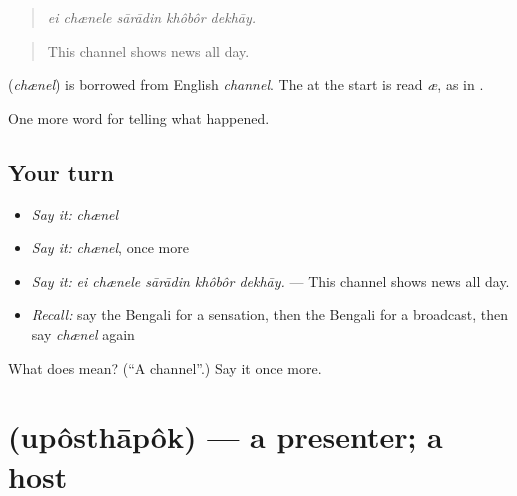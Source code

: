 \begin{quote}
    
\end{quote}

\begin{quote}
\emph{ei chænele sārādin khôbôr dekhāy.}
\end{quote}

\begin{quote}
This channel shows news all day.
\end{quote}

\begin{cousinweb}
\textbf{} (\emph{chænel}) is borrowed from English \emph{channel}. The  at the start is read \emph{æ}, as in \textbf{}.
\end{cousinweb}

\begin{grammarlens}[title={What you've built}]
One more word for telling what happened.
\end{grammarlens}

\subsection*{Your turn}
\begin{itemize}
\raggedright
  \item \emph{Say it:} \emph{chænel}
  \item \emph{Say it:} \emph{chænel}, once more
  \item \emph{Say it:} \emph{ei chænele sārādin khôbôr dekhāy.} — This channel shows news all day.
  \item \emph{Recall:} say the Bengali for a sensation, then the Bengali for a broadcast, then say \emph{chænel} again
\end{itemize}

\begin{tcolorbox}[breakable,colback=teal!4,colframe=teal!35!black,title={Before you move on}]
What does  mean? (\textquotedblleft{}A channel\textquotedblright{}.) Say it once more.
\end{tcolorbox}
\section[\texorpdfstring{\bn{উপস্থাপক} (upôsthāpôk)}{উপস্থাপক (upôsthāpôk)}]{ (upôsthāpôk) — a presenter; a host}

\label{lesson:BN-C299-uposthapok}



